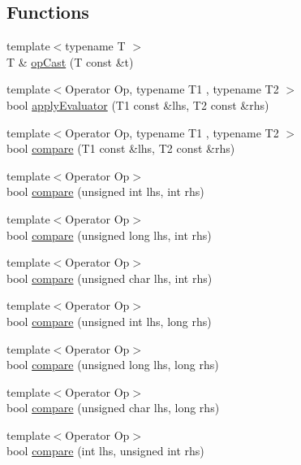 \subsection*{Functions}
\begin{DoxyCompactItemize}
\item 
{\footnotesize template$<$typename T $>$ }\\T \& \hyperlink{namespace_catch_1_1_internal_adde98c1a650e94615e2b37ab0b3734e2}{op\+Cast} (T const \&t)
\item 
{\footnotesize template$<$Operator Op, typename T1 , typename T2 $>$ }\\bool \hyperlink{namespace_catch_1_1_internal_a3849d993997f2b708281ff02e77dfecf}{apply\+Evaluator} (T1 const \&lhs, T2 const \&rhs)
\item 
{\footnotesize template$<$Operator Op, typename T1 , typename T2 $>$ }\\bool \hyperlink{namespace_catch_1_1_internal_a64ae04769c4583b9d4027c792b496c7d}{compare} (T1 const \&lhs, T2 const \&rhs)
\item 
{\footnotesize template$<$Operator Op$>$ }\\bool \hyperlink{namespace_catch_1_1_internal_a171aec1826898b877980a2b15fe5f735}{compare} (unsigned int lhs, int rhs)
\item 
{\footnotesize template$<$Operator Op$>$ }\\bool \hyperlink{namespace_catch_1_1_internal_aa2698c33ec87b16aff5c844165483a7a}{compare} (unsigned long lhs, int rhs)
\item 
{\footnotesize template$<$Operator Op$>$ }\\bool \hyperlink{namespace_catch_1_1_internal_ad68724393ee3d7629001a2997f6134cc}{compare} (unsigned char lhs, int rhs)
\item 
{\footnotesize template$<$Operator Op$>$ }\\bool \hyperlink{namespace_catch_1_1_internal_ac2af7b6757f9bb3539bb78acff5c4649}{compare} (unsigned int lhs, long rhs)
\item 
{\footnotesize template$<$Operator Op$>$ }\\bool \hyperlink{namespace_catch_1_1_internal_ace20062a489a8a7049fe224d62e644a7}{compare} (unsigned long lhs, long rhs)
\item 
{\footnotesize template$<$Operator Op$>$ }\\bool \hyperlink{namespace_catch_1_1_internal_a640e0cce9260a912842bee58db501dc5}{compare} (unsigned char lhs, long rhs)
\item 
{\footnotesize template$<$Operator Op$>$ }\\bool \hyperlink{namespace_catch_1_1_internal_a17c92ed4b6d88a9f8bbcbc52544fe40f}{compare} (int lhs, unsigned int rhs)

\end{DoxyCompactItemize}

